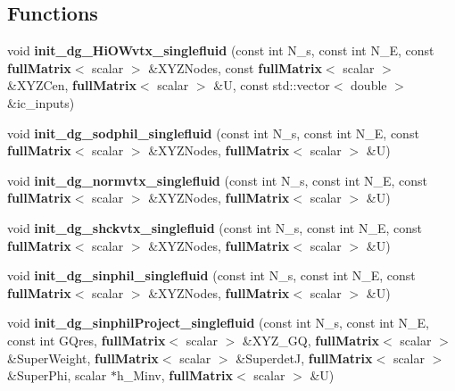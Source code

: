 \subsection*{Functions}
\begin{DoxyCompactItemize}
\item 
void {\bfseries init\-\_\-dg\-\_\-\-Hi\-O\-Wvtx\-\_\-singlefluid} (const int N\-\_\-s, const int N\-\_\-\-E, const {\bf full\-Matrix}$<$ scalar $>$ \&X\-Y\-Z\-Nodes, const {\bf full\-Matrix}$<$ scalar $>$ \&X\-Y\-Z\-Cen, {\bf full\-Matrix}$<$ scalar $>$ \&U, const std\-::vector$<$ double $>$ \&ic\-\_\-inputs)\label{init__cond_8cc_a8333da28129bd87c890cc62a3aab1f58}

\item 
void {\bfseries init\-\_\-dg\-\_\-sodphil\-\_\-singlefluid} (const int N\-\_\-s, const int N\-\_\-\-E, const {\bf full\-Matrix}$<$ scalar $>$ \&X\-Y\-Z\-Nodes, {\bf full\-Matrix}$<$ scalar $>$ \&U)\label{init__cond_8cc_a1cc84f891d4ae3b8ceafb14a0b0989fb}

\item 
void {\bfseries init\-\_\-dg\-\_\-normvtx\-\_\-singlefluid} (const int N\-\_\-s, const int N\-\_\-\-E, const {\bf full\-Matrix}$<$ scalar $>$ \&X\-Y\-Z\-Nodes, {\bf full\-Matrix}$<$ scalar $>$ \&U)\label{init__cond_8cc_a043fa3d53a043b04b9b7268fc3c8bed4}

\item 
void {\bfseries init\-\_\-dg\-\_\-shckvtx\-\_\-singlefluid} (const int N\-\_\-s, const int N\-\_\-\-E, const {\bf full\-Matrix}$<$ scalar $>$ \&X\-Y\-Z\-Nodes, {\bf full\-Matrix}$<$ scalar $>$ \&U)\label{init__cond_8cc_a5075be7cc4df4aa1371daccbdaedae19}

\item 
void {\bfseries init\-\_\-dg\-\_\-sinphil\-\_\-singlefluid} (const int N\-\_\-s, const int N\-\_\-\-E, const {\bf full\-Matrix}$<$ scalar $>$ \&X\-Y\-Z\-Nodes, {\bf full\-Matrix}$<$ scalar $>$ \&U)\label{init__cond_8cc_a0f965e297238e1bb6c228ecf9701a0cb}

\item 
void {\bfseries init\-\_\-dg\-\_\-sinphil\-Project\-\_\-singlefluid} (const int N\-\_\-s, const int N\-\_\-\-E, const int G\-Qres, {\bf full\-Matrix}$<$ scalar $>$ \&X\-Y\-Z\-\_\-\-G\-Q, {\bf full\-Matrix}$<$ scalar $>$ \&Super\-Weight, {\bf full\-Matrix}$<$ scalar $>$ \&Superdet\-J, {\bf full\-Matrix}$<$ scalar $>$ \&Super\-Phi, scalar $\ast$h\-\_\-\-Minv, {\bf full\-Matrix}$<$ scalar $>$ \&U)\label{init__cond_8cc_acb7391b3bfc82323d6a99a3a4da4f7bd}


\end{DoxyCompactItemize}
